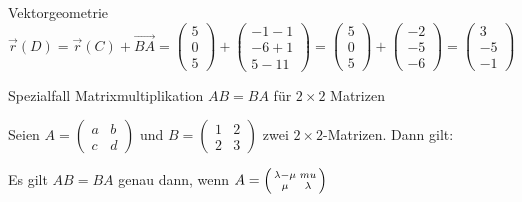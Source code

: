 \begin{example2}[breakable]{Vektorgeometrie}
$
\vec{r}(D)=\vec{r}(C)+\overrightarrow{B A}=\left(\begin{array}{l}
5 \\
0 \\
5
\end{array}\right)+\left(\begin{array}{l}
-1-1 \\
-6+1 \\
5-11
\end{array}\right)=\left(\begin{array}{l}
5 \\
0 \\
5
\end{array}\right)+\left(\begin{array}{l}
-2 \\
-5 \\
-6
\end{array}\right)=\left(\begin{array}{c}
3 \\
-5 \\
-1
\end{array}\right)
$

\end{example2}



\begin{example2}{Spezialfall Matrixmultiplikation} $AB = BA$ für $2\times 2$ Matrizen
    
        Seien $A=\left(\begin{array}{cc}a & b \\ c & d\end{array}\right)$ und $B=\left(\begin{array}{cc}1 & 2 \\ 2 & 3\end{array}\right)$ zwei $2 \times 2$-Matrizen. Dann gilt:
    
        Es gilt $AB = BA$ genau dann, wenn $A = \begin{psmallmatrix}
            \lambda-\mu & mu \\ \mu & \lambda
        \end{psmallmatrix}$
\end{example2}

